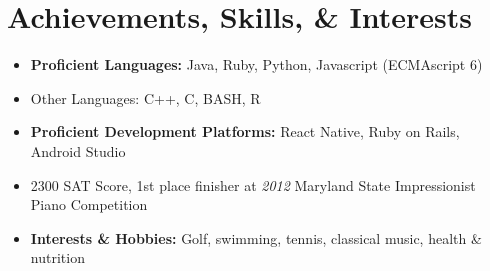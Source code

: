 \documentclass[11pt,letterpaper,calibri]{moderncv}        %
\begin{document}
\section{Achievements, Skills, \& Interests}

\begin{itemize}[leftmargin=0.2in]
\setlength\itemsep{-3pt}
\item \textbf{Proficient Languages:} Java, Ruby, Python, Javascript (ECMAscript 6)
\item Other Languages: C++, C, BASH, R
\item \textbf{Proficient Development Platforms:} React Native, Ruby on Rails, Android Studio
\item 2300 SAT Score, 1st place finisher at \textit{2012} Maryland State Impressionist Piano Competition
\item \textbf{Interests \& Hobbies:} Golf, swimming, tennis, classical music, health \& nutrition

\end{itemize}
\end{document}

